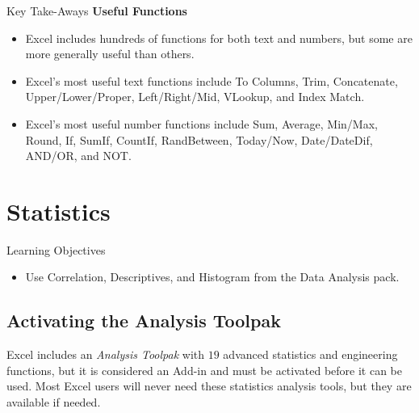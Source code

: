 \begin{enumbox}
\begin{enumerate}
	\end{enumerate}
\end{enumbox}
	
\begin{center}
	\begin{tkwbox}{Key Take-Aways}
		\textbf{Useful Functions}
		\\
		\begin{itemize}
			\setlength{\itemsep}{0pt}
			\setlength{\parskip}{0pt}
			\setlength{\parsep}{0pt}
			
			\item Excel includes hundreds of functions for both text and numbers, but some are more generally useful than others.  
			\item Excel's most useful text functions include To Columns, Trim, Concatenate, Upper/Lower/Proper, Left/Right/Mid, VLookup, and Index Match.
			\item Excel's most useful number functions include Sum, Average, Min/Max, Round, If, SumIf, CountIf, RandBetween, Today/Now, Date/DateDif, AND/OR, and NOT.
			
		\end{itemize}
	\end{tkwbox}
\end{center}

\section{Statistics}

\begin{center}
	\begin{objbox}{Learning Objectives}
		\begin{itemize}
			\setlength{\itemsep}{0pt}
			\setlength{\parskip}{0pt}
			\setlength{\parsep}{0pt}
			
			\item Use Correlation, Descriptives, and Histogram from the Data Analysis pack.
			
		\end{itemize}
	\end{objbox}
\end{center}

\subsection{Activating the Analysis Toolpak}

Excel includes an \textit{Analysis Toolpak} with $ 19 $ advanced statistics and engineering functions, but it is considered an Add-in and must be activated before it can be used. Most Excel users will never need these statistics analysis tools, but they are available if needed.

